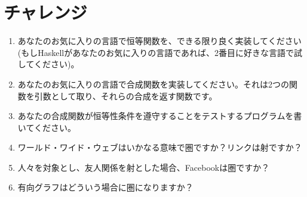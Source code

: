 \section{チャレンジ}

\begin{enumerate}
  \tightlist
  \item
        あなたのお気に入りの言語で恒等関数を、できる限り良く実装してください (もしHaskellがあなたのお気に入りの言語であれば、2番目に好きな言語で試してください)。
  \item
        あなたのお気に入りの言語で合成関数を実装してください。それは2つの関数を引数として取り、それらの合成を返す関数です。
  \item
        あなたの合成関数が恒等性条件を遵守することをテストするプログラムを書いてください。
  \item
        ワールド・ワイド・ウェブはいかなる意味で圏ですか？リンクは射ですか？
  \item
        人々を対象とし、友人関係を射とした場合、Facebookは圏ですか？
  \item
        有向グラフはどういう場合に圏になりますか？
\end{enumerate}
